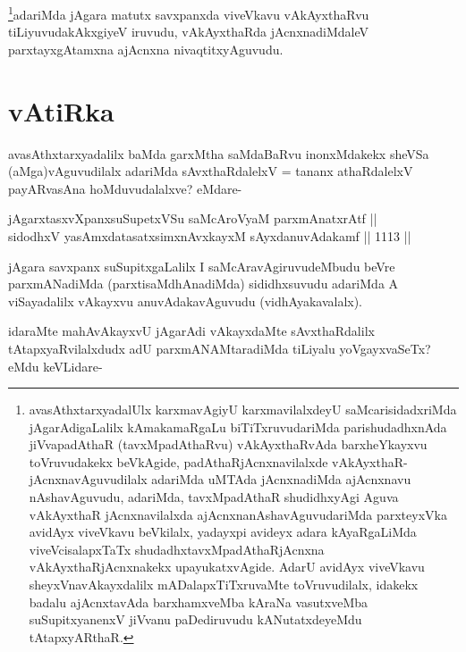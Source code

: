 \begin{artha}
\footnote{avasAthxtarxyadalUlx karxmavAgiyU karxmavilalxdeyU saMcarisidadxriMda jAgarAdigaLalilx kAmakamaRgaLu biTiTxruvudariMda parishudadhxnAda jiVvapadAthaR (tavxMpadAthaRvu) vAkAyxthaRvAda barxheYkayxvu toVruvudakekx beVkAgide, padAthaRjAcnxnavilalxde vAkAyxthaR- jAcnxnavAguvudilalx adariMda uMTAda jAcnxnadiMda ajAcnxnavu nAshavAguvudu, adariMda, tavxMpadAthaR shudidhxyAgi Aguva vAkAyxthaR jAcnxnavilalxda ajAcnxnanAshavAguvudariMda parxteyxVka avidAyx viveVkavu beVkilalx, yadayxpi avideyx adara kAyaRgaLiMda viveVcisalapxTaTx shudadhxtavxMpadAthaRjAcnxna vAkAyxthaRjAcnxnakekx upayukatxvAgide. AdarU avidAyx viveVkavu sheyxVnavAkayxdalilx mADalapxTiTxruvaMte toVruvudilalx, idakekx badalu ajAcnxtavAda barxhamxveMba kAraNa vasutxveMba suSupitxyanenxV jiVvanu paDediruvudu kANutatxdeyeMdu tAtapxyARthaR.}adariMda jAgara matutx savxpanxda viveVkavu vAkAyxthaRvu tiLiyuvudakAkxgiyeV iruvudu, vAkAyxthaRda jAcnxnadiMdaleV parxtayxgAtamxna ajAcnxna nivaqtitxyAguvudu.
\end{artha}

\section*{vAtiRka}

\begin{artha}
avasAthxtarxyadalilx baMda garxMtha saMdaBaRvu inonxMdakekx sheVSa (aMga)vAguvudilalx adariMda sAvxthaRdalelxV = tananx athaRdalelxV payARvasAna hoMduvudalalxve? eMdare-
\end{artha}

\begin{shl}
jAgarxtasxvXpanxsuSupetxVSu saMcAroV\s yaM parxmAnatxrAtf ||  \\
sidodhxV yasAmxdatasatxsimxnAvxkayxM sAyxdanuvAdakamf \hfill || 1113 ||  
\end{shl}

\begin{artha}
jAgara savxpanx suSupitxgaLalilx I saMcAravAgiruvudeMbudu beVre parxmANadiMda (parxtisaMdhAnadiMda) sididhxsuvudu adariMda A viSayadalilx vAkayxvu anuvAdakavAguvudu (vidhAyakavalalx).
\end{artha}

\begin{artha}
idaraMte mahAvAkayxvU jAgarAdi vAkayxdaMte sAvxthaRdalilx tAtapxyaRvilalxdudx adU parxmANAMtaradiMda tiLiyalu yoVgayxvaSeTx? eMdu keVLidare-
\end{artha}


